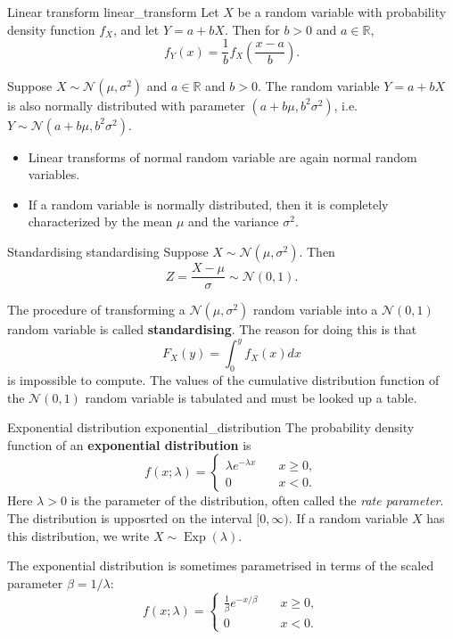 \begin{lemma}{Linear transform \cite{math2901_notes}}{linear_transform}
	Let $X$ be a random variable with probability density function $f_X$, and let $Y = a + bX$. Then for $b > 0$ and $a \in \mathbb{R}$,
	$$ f_Y(x) = \frac{1}{b} f_X \left( \frac{x - a}{b} \right) . $$
\end{lemma}

\begin{lemma}{\cite{math2901_notes}}{}
	Suppose $X \sim \mathcal{N}(\mu, \sigma^2)$ and $a \in \mathbb{R}$ and $b > 0$. The random variable $Y = a + bX$ is also normally distributed with parameter $(a + b \mu, b^2 \sigma^2)$, i.e. $Y \sim \mathcal{N}(a + b \mu, b^2 \sigma^2)$.
\end{lemma}

\begin{itemize}
	\item Linear transforms of normal random variable are again	normal random variables.
	\item If a random variable is normally distributed, then it is completely
	characterized by the mean $\mu$ and the variance $\sigma^2$.	
\end{itemize}

\begin{corollary}{Standardising \cite{math2901_notes}}{standardising}
	Suppose $X \sim \mathcal{N}(\mu, \sigma^2)$. Then
	$$ Z = \frac{X - \mu}{\sigma} \sim \mathcal{N}(0, 1) . $$
\end{corollary}

The procedure of transforming a $\mathcal{N}(\mu, \sigma^2)$ random variable into a $\mathcal{N}(0, 1)$ random variable is called \textbf{standardising}. The reason for doing this is that
$$ F_X(y) = \int_0^y f_X(x) dx $$
is impossible to compute. The values of the cumulative distribution function of the $\mathcal{N}(0, 1)$ random variable is tabulated and must be looked up a table.

\begin{definition}{Exponential distribution \cite{wikipedia_exponential_distribution}}{exponential_distribution}
	The probability density function of an \textbf{exponential distribution} is
	$$
		f(x; \lambda) = 
			\begin{cases}
				\lambda e^{-\lambda x} \quad &x \geq 0, \\
				0 \quad &x < 0. 
			\end{cases}
	$$
	Here $\lambda > 0$ is the parameter of the distribution, often called the \textit{rate parameter}. The distribution is upposrted on the interval $[0, \infty)$. If a random variable $X$ has this distribution, we write $X \sim \operatorname{Exp}(\lambda)$.

	The exponential distribution is sometimes parametrised in terms of the scaled parameter $\beta = 1/\lambda$:
	$$
		f(x; \lambda) = 
			\begin{cases}
				\frac{1}{\beta} e^{-x/\beta} \quad &x \geq 0, \\
				0 \quad &x < 0. 
			\end{cases}
	$$
\end{definition}

